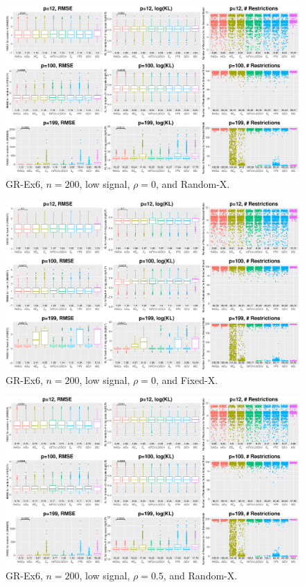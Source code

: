 \clearpage
\begin{figure}[!ht]
\centering
\includegraphics[width=\textwidth]{figures/supplement/randomx_GR-Ex6_n200_lsnr_rho0.eps}
\caption{GR-Ex6, $n=200$, low signal, $\rho=0$, and Random-X.}
\end{figure}
\begin{figure}[!ht]
\centering
\includegraphics[width=\textwidth]{figures/supplement/fixedx_GR-Ex6_n200_lsnr_rho0.eps}
\caption{GR-Ex6, $n=200$, low signal, $\rho=0$, and Fixed-X.}
\end{figure}
\clearpage
\begin{figure}[!ht]
\centering
\includegraphics[width=\textwidth]{figures/supplement/randomx_GR-Ex6_n200_lsnr_rho05.eps}
\caption{GR-Ex6, $n=200$, low signal, $\rho=0.5$, and Random-X.}
\end{figure}
